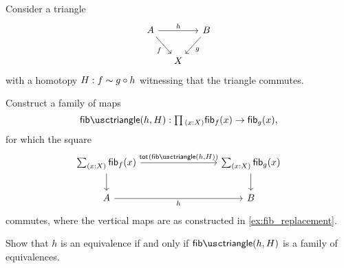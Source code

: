 \begin{exercises}
\exercise \label{ex:fiber_trans}Consider a triangle
\begin{equation*}
\begin{tikzcd}[column sep=small]
A \arrow[rr,"h"] \arrow[dr,swap,"f"] & & B \arrow[dl,"g"] \\
& X
\end{tikzcd}
\end{equation*}
with a homotopy $H:f\sim g\circ h$ witnessing that the triangle commutes. 
\begin{subexenum}
\item Construct a family of maps
\begin{equation*}
\fibtriangle(h,H):\prd{x:X}\fib{f}{x}\to\fib{g}{x},
\end{equation*}
for which the square
\begin{equation*}
\begin{tikzcd}[column sep=8em]
\sm{x:X}\fib{f}{x} \arrow[r,"\tot{\fibtriangle(h,H)}"] \arrow[d] & \sm{x:X}\fib{g}{x} \arrow[d] \\
A \arrow[r,swap,"h"] & B
\end{tikzcd}
\end{equation*}
commutes, where the vertical maps are as constructed in \cref{ex:fib_replacement}.
\item Show that $h$ is an equivalence if and only if $\fibtriangle(h,H)$ is a family of equivalences.
\end{subexenum}
\begin{comment}
\exercise Let $f:A\to B$ be a map, and let $s,t : \fib{f}{b}$. Consider the function
\begin{equation*}
\varphi : (s=t)\to \fib{\apfunc{f}}{\ct{\proj 2(s)}{\proj 2(t)^{-1}}}
\end{equation*}
given by $\varphi(\refl{s})=(\refl{\proj 1(s)},\rightinv(\proj 2(s))^{-1})$. Show that this map is an equivalence. Conclude that for any $q:f(x)=f(y)$ we have an equivalence
\begin{equation*}
((x,q)=(y,\refl{f(y)})) \simeq \fib{\apfunc{f}}{q}.
\end{equation*}
\exercise Construct an equivalence 
\begin{equation*}
\eqv{\big(\sm{x:A}f(x)=y\big)}{\big(\sm{x:A}y=f(x)\big)}.
\end{equation*}
\end{comment}
\end{exercises}
